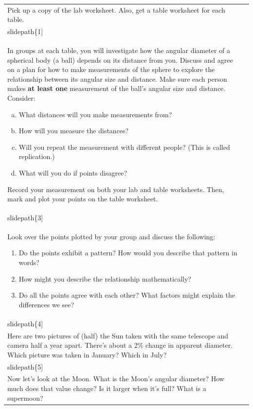 \documentclass[12pt]{article}
\begin{document}
\begin{longtable}{|m{}|m{}|}\hline
Pick up a copy of the lab worksheet. Also, get a table worksheet for each table. & \texttt{[image: \\slidepath\{1]}}\\\hline
In groups at each table, you will investigate how the angular diameter of a spherical body (a ball) depends on its distance from you. Discuss and agree on a plan for how to make measurements of the sphere to explore the relationship between its angular size and distance. Make sure each person makes \textbf{at least one} measurement of the ball's angular size and distance. Consider:
\begin{enumerate}[a.]
\item What distances will you make measurements from?
\item How will you measure the distances?
\item Will you repeat the measurement with different people? (This is called replication.)
\item What will you do if points disagree?
\end{enumerate}
Record your measurement on both your lab and table worksheets. Then, mark and plot your points on the table worksheet.
 & \texttt{[image: \\slidepath\{3]}}\\\hline
Look over the points plotted by your group and discuss the following:
\begin{enumerate}
\item Do the points exhibit a pattern? How would you describe that pattern in words?
\item How might you describe the relationship mathematically?
\item Do all the points agree with each other? What factors might explain the differences we see?
\end{enumerate}
 & \texttt{[image: \\slidepath\{4]}}\\\hline
Here are two pictures of (half) the Sun taken with the same telescope and camera half a year apart. There's about a 2\% change in apparent diameter. Which picture was taken in January? Which in July? 
 & \texttt{[image: \\slidepath\{5]}}\\\hline
Now let's look at the Moon. What is the Moon's angular diameter? How much does that value change? Is it larger when it's full? What is a supermoon? 


\end{longtable}
\end{document}
